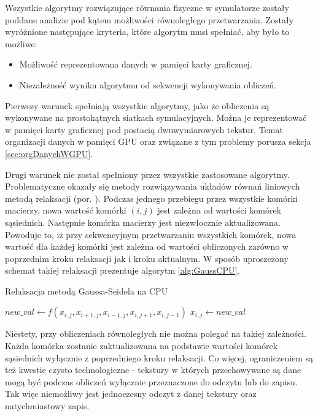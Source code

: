 Wszystkie algorytmy rozwiązujące równania fizyczne w symulatorze 
zostały poddane analizie pod kątem możliwości równoległego przetwarzania.
Zostały wyróżnione następujące kryteria, które algorytm musi spełniać, aby było
to możliwe:

\begin{itemize}

\item Możliwość reprezentowana danych w pamięci karty graficznej.

\item Niezależność wyniku algorytmu od sekwencji wykonywania obliczeń.

\end{itemize}

Pierwszy warunek spełniają wszystkie algorytmy, jako że obliczenia są wykonywane
na prostokątnych siatkach symulacyjnych. Można je reprezentować w pamięci karty
graficznej pod postacią dwuwymiarowych tekstur. Temat organizacji danych w
pamięci GPU oraz związane z tym problemy porusza sekcja \ref{sec:orgDanychWGPU}.

Drugi warunek nie został spełniony przez wszystkie zastosowane algorytmy.
Problematyczne okazały się metody rozwiązywania układów równań liniowych metodą
relaksacji  (por. \cite{GaussSeidel}). Podczas jednego
przebiegu przez wszystkie komórki macierzy, nowa wartość komórki $(i, j)$ jest
zależna od wartości komórek sąsiednich. Następnie komórka macierzy jest
niezwłocznie aktualizowana. Powoduje to, iż przy sekwencyjnym przetwarzaniu
wszystkich komórek, nowa wartość dla każdej komórki jest zależna od wartości
obliczonych zarówno w poprzednim kroku relaksacji jak i kroku aktualnym. W
sposób uproszczony schemat takiej relaksacji prezentuje algorytm
\ref{alg:GaussCPU}.

\begin{algorithm}[H]
  \caption{Relaksacja metodą Gaussa-Seidela na CPU}
  \label{alg:GaussCPU}
\begin{algorithmic}
    \State $new\_val\gets f(x_{i,j}, x_{i+1,j}, x_{i-1,j}, x_{i,j+1}, x_{i,j-1})$
    \State $x_{i,j}\gets new\_val$
  \EndFor
\EndFor
\end{algorithmic}
\end{algorithm}

Niestety, przy obliczeniach równoległych nie można polegać na takiej zależności.
Każda komórka zostanie zaktualizowana na podstawie wartości komórek sąsiednich
wyłącznie z poprzedniego kroku relaksacji. Co więcej, ograniczeniem są też
kwestie czysto technologiczne - tekstury w których przechowywane są dane mogą
być podczas obliczeń wyłącznie przeznaczone do odczytu lub do zapisu. Tak więc
niemożliwy jest jednoczesny odczyt z danej tekstury oraz natychmiastowy zapis.

